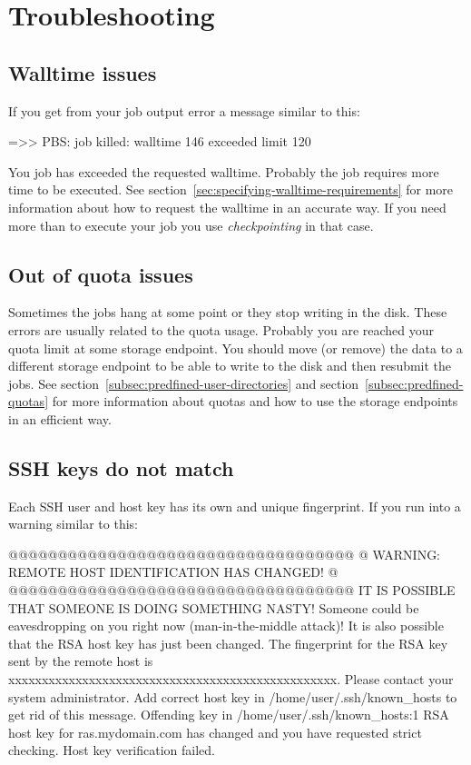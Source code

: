 \chapter{Troubleshooting}
\label{ch:troubleshooting}



\section{Walltime issues}
If you get from your job output error a message similar to this:

\begin{prompt}
 =>> PBS: job killed: walltime 146 exceeded limit 120
\end{prompt}

You job has exceeded the requested walltime. Probably the job requires more time to be executed.
See section~\ref{sec:specifying-walltime-requirements} for more information about how to request the walltime in an accurate way.
If you need more than  to execute your job you  use \emph{checkpointing} in that case.



\section{Out of quota issues}

Sometimes the jobs hang at some point or they stop writing in the disk. These errors are usually
related to the quota usage. Probably you are reached your quota limit at some storage endpoint. 
You should move (or remove) the data to a different storage endpoint to be able to write to the disk and then resubmit the jobs. 
See section~\ref{subsec:predfined-user-directories} and section~\ref{subsec:predfined-quotas} for more information about 
quotas and how to use the storage endpoints in an efficient way.


\section{SSH keys do not match}
Each SSH user and host key has its own and unique fingerprint.
If you run into a warning similar to this:

\begin{prompt}
@@@@@@@@@@@@@@@@@@@@@@@@@@@@@@@@@@@
@ WARNING: REMOTE HOST IDENTIFICATION HAS CHANGED! @
@@@@@@@@@@@@@@@@@@@@@@@@@@@@@@@@@@@
IT IS POSSIBLE THAT SOMEONE IS DOING SOMETHING NASTY!
Someone could be eavesdropping on you right now (man-in-the-middle attack)!
It is also possible that the RSA host key has just been changed.
The fingerprint for the RSA key sent by the remote host is
xxxxxxxxxxxxxxxxxxxxxxxxxxxxxxxxxxxxxxxxxxxxxxxxx.
Please contact your system administrator.
Add correct host key in /home/user/.ssh/known_hosts to get rid of this message.
Offending key in /home/user/.ssh/known_hosts:1
RSA host key for ras.mydomain.com has changed and you have requested strict checking.
Host key verification failed.
\end{prompt}

